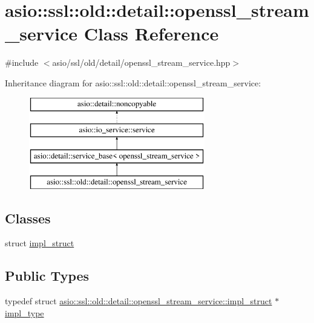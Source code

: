 \hypertarget{classasio_1_1ssl_1_1old_1_1detail_1_1openssl__stream__service}{}\section{asio\+:\+:ssl\+:\+:old\+:\+:detail\+:\+:openssl\+\_\+stream\+\_\+service Class Reference}
\label{classasio_1_1ssl_1_1old_1_1detail_1_1openssl__stream__service}


{\ttfamily \#include $<$asio/ssl/old/detail/openssl\+\_\+stream\+\_\+service.\+hpp$>$}

Inheritance diagram for asio\+:\+:ssl\+:\+:old\+:\+:detail\+:\+:openssl\+\_\+stream\+\_\+service\+:\begin{figure}[H]
\begin{center}
\leavevmode
\includegraphics[height=4.000000cm]{classasio_1_1ssl_1_1old_1_1detail_1_1openssl__stream__service}
\end{center}
\end{figure}
\subsection*{Classes}
\begin{DoxyCompactItemize}
\item 
struct \hyperlink{structasio_1_1ssl_1_1old_1_1detail_1_1openssl__stream__service_1_1impl__struct}{impl\+\_\+struct}
\end{DoxyCompactItemize}
\subsection*{Public Types}
\begin{DoxyCompactItemize}
\item 
typedef struct \hyperlink{structasio_1_1ssl_1_1old_1_1detail_1_1openssl__stream__service_1_1impl__struct}{asio\+::ssl\+::old\+::detail\+::openssl\+\_\+stream\+\_\+service\+::impl\+\_\+struct} $\ast$ \hyperlink{classasio_1_1ssl_1_1old_1_1detail_1_1openssl__stream__service_a2419fd5a889197ed63b6d0bd14656027}{impl\+\_\+type}
\end{DoxyCompactItemize}
